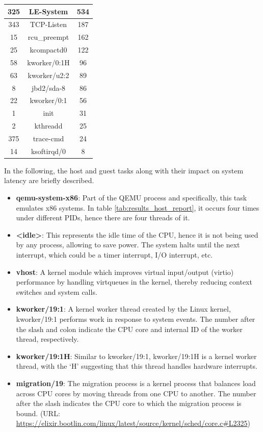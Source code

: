 \documentclass[MMR,Master,english]{twbook}
\begin{document}
\begin{table}[h!]
\begin{minipage}{.5\textwidth}
\begin{tabular}{|c|c|c|}
	325 & LE-System & 534 \\ \hline
	343 & TCP-Listen & 187 \\ \hline
	15 & rcu\_preempt & 162 \\ \hline
	25 & kcompactd0 & 122 \\ \hline
	58 & kworker/0:1H & 96 \\ \hline
	63 & kworker/u2:2 & 89 \\ \hline
	8 & jbd2/sda-8 & 86 \\ \hline
	22 & kworker/0:1 & 56 \\ \hline
	1 & init & 31 \\ \hline
	2 & kthreadd & 25 \\ \hline
	375 & trace-cmd & 24 \\ \hline
	14 & ksoftirqd/0 & 8 \\ \hline
	\end{tabular}
	\end{minipage}
	\end{table}

\noindent In the following, the host and guest tasks along with their impact on system latency are briefly described. 

\begin{itemize} 
	\item \textbf{qemu-system-x86}: Part of the QEMU process and specifically, this task emulates x86 systems. In table \ref{tab:results_host_report}, it occurs four times under different PIDs, hence there are four threads of it.
	\item \textbf{<idle>}: This represents the idle time of the CPU, hence it is not being used by any process, allowing to save power. The system halts until the next interrupt, which could be a timer interrupt, I/O interrupt, etc.
	\item \textbf{vhost}: A kernel module which improves virtual input/output (virtio) performance by handling virtqueues in the kernel, thereby reducing context switches and system calls. 
	\item \textbf{kworker/19:1}: A kernel worker thread created by the Linux kernel, kworker/19:1 performs work in response to system events. The number after the slash and colon indicate the CPU core and internal ID of the worker thread, respectively. 
	\item \textbf{kworker/19:1H}: Similar to kworker/19:1, kworker/19:1H is a kernel worker thread, with the ‘H’ suggesting that this thread handles hardware interrupts. 
	\item \textbf{migration/19}: The migration process is a kernel process that balances load across CPU cores by moving threads from one CPU to another. The number after the slash indicates the CPU core to which the migration process is bound. (URL: \url{https://elixir.bootlin.com/linux/latest/source/kernel/sched/core.c#L2325})

\end{itemize}
\end{document}
